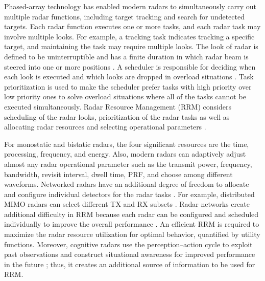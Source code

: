 \documentclass[english, 12pt, a4paper, elec, utf8, a-1b, online]{aaltothesis}
\numberwithin{equation}{section}
\begin{document}
Phased-array technology has enabled modern radars to simultaneously carry out multiple radar functions, including target tracking and search for undetected targets.
Each radar function executes one or more tasks, and each radar task may involve multiple looks.
For example, a tracking task indicates tracking a specific target, and maintaining the task may require multiple looks.
The look of radar is defined to be uninterruptible and has a finite duration in which radar beam is steered into one or more positions \cite{Moo2016}.
A scheduler is responsible for deciding when each look is executed and which looks are dropped in overload situations \cite{Moo2016}. 
Task prioritization is used to make the scheduler prefer tasks with high priority over low priority ones to solve overload situations where all of the tasks cannot be executed simultaneously.
Radar Resource Management (RRM) considers scheduling of the radar looks, prioritization of the radar tasks as well as allocating radar resources and selecting operational parameters \cite{Moo2016}. 

For monostatic and bistatic radars, the four significant resources are the time, processing, frequency, and energy. 
Also, modern radars can adaptively adjust almost any radar operational parameter such as the transmit power, frequency, bandwidth, revisit interval, dwell time, PRF, and choose among different waveforms.
Networked radars have an additional degree of freedom to allocate and configure individual detectors for the radar tasks \cite{Moo2016}. 
For example, distributed MIMO radars can select different TX and RX subsets \cite{Godrich2011a, Godrich2011, Sun2014}.
Radar networks create additional difficulty in RRM because each radar can be configured and scheduled individually to improve the overall performance \cite{Sun2014}.
An efficient RRM is required to maximize the radar resource utilization for optimal behavior, quantified by utility functions. 
Moreover, cognitive radars use the perception--action cycle to exploit past observations and construct situational awareness for improved performance in the future \cite{Haykin2006}; thus, it creates an additional source of information to be used for RRM.
\end{document}
